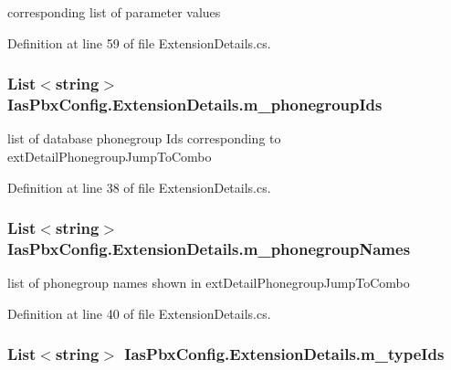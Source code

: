 corresponding list of parameter values 

Definition at line 59 of file ExtensionDetails.cs.\hypertarget{class_ias_pbx_config_1_1_extension_details_a1f41108381e37e3226b3327478bdc5d5}{
\subsubsection[{m\_\-phonegroupIds}]{\setlength{\rightskip}{0pt plus 5cm}List$<$string$>$ {\bf IasPbxConfig.ExtensionDetails.m\_\-phonegroupIds}}}
\label{class_ias_pbx_config_1_1_extension_details_a1f41108381e37e3226b3327478bdc5d5}


list of database phonegroup Ids corresponding to extDetailPhonegroupJumpToCombo 

Definition at line 38 of file ExtensionDetails.cs.\hypertarget{class_ias_pbx_config_1_1_extension_details_a6434f33b3ac74f89fd3b13b228bd38d4}{
\subsubsection[{m\_\-phonegroupNames}]{\setlength{\rightskip}{0pt plus 5cm}List$<$string$>$ {\bf IasPbxConfig.ExtensionDetails.m\_\-phonegroupNames}}}
\label{class_ias_pbx_config_1_1_extension_details_a6434f33b3ac74f89fd3b13b228bd38d4}


list of phonegroup names shown in extDetailPhonegroupJumpToCombo 

Definition at line 40 of file ExtensionDetails.cs.\hypertarget{class_ias_pbx_config_1_1_extension_details_acce0ec857d3ed51a1137fdb07ab6ce57}{
\subsubsection[{m\_\-typeIds}]{\setlength{\rightskip}{0pt plus 5cm}List$<$string$>$ {\bf IasPbxConfig.ExtensionDetails.m\_\-typeIds}}}
\label{class_ias_pbx_config_1_1_extension_details_acce0ec857d3ed51a1137fdb07ab6ce57}


